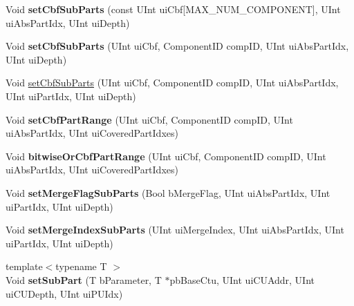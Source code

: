 \begin{DoxyCompactItemize}
\mbox{\label{class_t_com_data_c_u_a5bfa8854e1e2c7afe3d4a1d211410b39}} 
Void {\bfseries set\+Cbf\+Sub\+Parts} (const U\+Int ui\+Cbf\mbox{[}M\+A\+X\+\_\+\+N\+U\+M\+\_\+\+C\+O\+M\+P\+O\+N\+E\+NT\mbox{]}, U\+Int ui\+Abs\+Part\+Idx, U\+Int ui\+Depth)
\item 
\mbox{\label{class_t_com_data_c_u_a8caad9fa92dc5bae8ed85b237dd1be46}} 
Void {\bfseries set\+Cbf\+Sub\+Parts} (U\+Int ui\+Cbf, Component\+ID comp\+ID, U\+Int ui\+Abs\+Part\+Idx, U\+Int ui\+Depth)
\item 
Void \hyperlink{class_t_com_data_c_u_a796f6a0d1263e828d8b66a24513f763a}{set\+Cbf\+Sub\+Parts} (U\+Int ui\+Cbf, Component\+ID comp\+ID, U\+Int ui\+Abs\+Part\+Idx, U\+Int ui\+Part\+Idx, U\+Int ui\+Depth)
\item 
\mbox{\label{class_t_com_data_c_u_a1d056b7b6cc5597340fd8156b92c0e38}} 
Void {\bfseries set\+Cbf\+Part\+Range} (U\+Int ui\+Cbf, Component\+ID comp\+ID, U\+Int ui\+Abs\+Part\+Idx, U\+Int ui\+Covered\+Part\+Idxes)
\item 
\mbox{\label{class_t_com_data_c_u_a88a0a81f8f18369f4e4def9b2e43955b}} 
Void {\bfseries bitwise\+Or\+Cbf\+Part\+Range} (U\+Int ui\+Cbf, Component\+ID comp\+ID, U\+Int ui\+Abs\+Part\+Idx, U\+Int ui\+Covered\+Part\+Idxes)
\item 
\mbox{\label{class_t_com_data_c_u_a145f2ba914136bed2eefe5242ac5951f}} 
Void {\bfseries set\+Merge\+Flag\+Sub\+Parts} (Bool b\+Merge\+Flag, U\+Int ui\+Abs\+Part\+Idx, U\+Int ui\+Part\+Idx, U\+Int ui\+Depth)
\item 
\mbox{\label{class_t_com_data_c_u_aac7ca8aa3a2f31ef51412c170d4ac323}} 
Void {\bfseries set\+Merge\+Index\+Sub\+Parts} (U\+Int ui\+Merge\+Index, U\+Int ui\+Abs\+Part\+Idx, U\+Int ui\+Part\+Idx, U\+Int ui\+Depth)
\item 
\mbox{\label{class_t_com_data_c_u_a4d48ef262ee166a0498c4f0507693a50}} 
{\footnotesize template$<$typename T $>$ }\\Void {\bfseries set\+Sub\+Part} (T b\+Parameter, T $\ast$pb\+Base\+Ctu, U\+Int ui\+C\+U\+Addr, U\+Int ui\+C\+U\+Depth, U\+Int ui\+P\+U\+Idx)
\item 

\end{DoxyCompactItemize}
